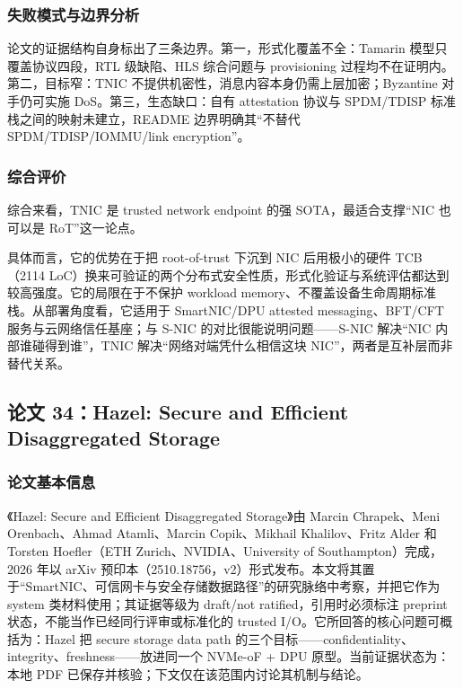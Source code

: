 \documentclass[11pt]{ctexart}
\begin{document}
\subsubsection{失败模式与边界分析}
论文的证据结构自身标出了三条边界。第一，形式化覆盖不全：Tamarin 模型只覆盖协议四段，RTL 级缺陷、HLS 综合问题与 provisioning 过程均不在证明内。第二，目标窄：TNIC 不提供机密性，消息内容本身仍需上层加密；Byzantine 对手仍可实施 DoS。第三，生态缺口：自有 attestation 协议与 SPDM/TDISP 标准栈之间的映射未建立，README 边界明确其“不替代 SPDM/TDISP/IOMMU/link encryption”。\par
\subsubsection{综合评价}
综合来看，TNIC 是 trusted network endpoint 的强 SOTA，最适合支撑“NIC 也可以是 RoT”这一论点。\par
具体而言，它的优势在于把 root-of-trust 下沉到 NIC 后用极小的硬件 TCB（2114 LoC）换来可验证的两个分布式安全性质，形式化验证与系统评估都达到较高强度。它的局限在于不保护 workload memory、不覆盖设备生命周期标准栈。从部署角度看，它适用于 SmartNIC/DPU attested messaging、BFT/CFT 服务与云网络信任基座；与 S-NIC 的对比很能说明问题——S-NIC 解决“NIC 内部谁碰得到谁”，TNIC 解决“网络对端凭什么相信这块 NIC”，两者是互补层而非替代关系。\par
\subsection{论文 34：Hazel: Secure and Efficient Disaggregated Storage}
\subsubsection{论文基本信息}
《Hazel: Secure and Efficient Disaggregated Storage》由 Marcin Chrapek、Meni Orenbach、Ahmad Atamli、Marcin Copik、Mikhail Khalilov、Fritz Alder 和 Torsten Hoefler（ETH Zurich、NVIDIA、University of Southampton）完成，2026 年以 arXiv 预印本（2510.18756，v2）形式发布。本文将其置于“SmartNIC、可信网卡与安全存储数据路径”的研究脉络中考察，并把它作为 system 类材料使用；其证据等级为 draft/not ratified，引用时必须标注 preprint 状态，不能当作已经同行评审或标准化的 trusted I/O。它所回答的核心问题可概括为：Hazel 把 secure storage data path 的三个目标——confidentiality、integrity、freshness——放进同一个 NVMe-oF + DPU 原型。当前证据状态为：本地 PDF 已保存并核验；下文仅在该范围内讨论其机制与结论。\cite{chrapek2026hazel}\par
\end{document}
